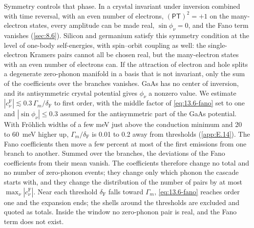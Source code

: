 Symmetry controls that phase. In a crystal invariant under inversion combined with time reversal, with an even number of electrons, $(\mathsf{P}\mathsf{T})^2 = +1$ on the many-electron states, every amplitude can be made real, $\sin\phi_\nu = 0$, and the Fano term vanishes (\cref{sec:8.6}). Silicon and germanium satisfy this symmetry condition at the level of one-body self-energies, with spin--orbit coupling as well: the single-electron Kramers pairs cannot all be chosen real, but the many-electron states with an even number of electrons can. If the attraction of electron and hole splits a degenerate zero-phonon manifold in a basis that is not invariant, only the sum of the coefficients over the branches vanishes. GaAs has no center of inversion, and its antisymmetric crystal potential gives $\phi_\nu$ a nonzero value. We estimate $|c^{\mathrm{F}}_\nu| \lesssim 0.3\,\varGamma_m/\delta_{\mathrm{F}}$ to first order, with the middle factor of \cref{eq:13.6-fano} set to one and $|\sin\phi_\nu| \le 0.3$ assumed for the antisymmetric part of the GaAs potential. With Fr\"ohlich widths of a few meV just above the conduction minimum and 20 to \SI{60}{meV} higher up, $\varGamma_m/\delta_{\mathrm{F}}$ is 0.01 to 0.2 away from thresholds (\cref{app:E.14}). The Fano coefficients then move a few percent at most of the first emissions from one branch to another. Summed over the branches, the deviations of the Fano coefficients from their mean vanish. The coefficients therefore change no total and no number of zero-phonon events; they change only which phonon the cascade starts with, and they change the distribution of the number of pairs by at most $\max_\nu|c^{\mathrm{F}}_\nu|$. Near each threshold $\delta_{\mathrm{F}}$ falls toward $\varGamma_m$, \cref{eq:13.6-fano} reaches order one and the expansion ends; the shells around the thresholds are excluded and quoted as totals. Inside the window no zero-phonon pair is real, and the Fano term does not exist.
